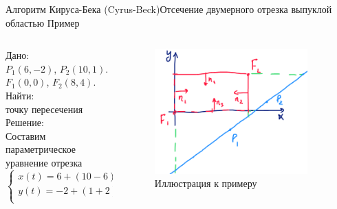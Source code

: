 \documentclass{beamer}
\begin{document}
\begin{frame}{Алгоритм Кируса-Бека (Cyrus-Beck)}{Отсечение двумерного отрезка выпуклой областью}
	Пример

	\begin{columns}
		\begin{column}{0.5\textwidth}
			Дано: \\
			$P_1(6,-2)$, $P_2(10,1)$. \\
			$F_1(0,0)$, $F_2(8,4)$.
			\\
			Найти: 
			\\
			точку пересечения
			\\
			Решение:
			\\
			Составим параметрическое уравнение отрезка
			\[
				\begin{cases}
					x(t) = 6 + (10 - 6) t\\
					y(t) = -2 + (1 + 2) t\\
				\end{cases}	
			\]
		\end{column}
		\begin{column}{0.5\textwidth}
			\begin{figure} 
				\includegraphics[width=0.9\textwidth]{images/example_cyrus-beck.png}
				\caption {Иллюстрация к примеру}
			\end{figure}
		\end{column}
	\end{columns}





	\note{

}
\end{frame}
\end{document}
